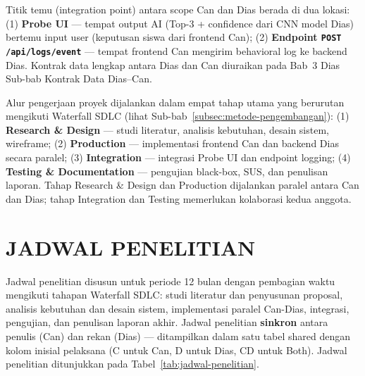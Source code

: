 \documentclass[12pt,a4paper,oneside,openany]{report}
\begin{document}
Titik temu (integration point) antara scope Can dan Dias berada di dua lokasi: (1) \textbf{Probe UI} --- tempat output AI (Top-3 + confidence dari CNN model Dias) bertemu input user (keputusan siswa dari frontend Can); (2) \textbf{Endpoint \texttt{POST /api/logs/event}} --- tempat frontend Can mengirim behavioral log ke backend Dias. Kontrak data lengkap antara Dias dan Can diuraikan pada Bab~3 Dias Sub-bab Kontrak Data Dias--Can.

Alur pengerjaan proyek dijalankan dalam empat tahap utama yang berurutan mengikuti Waterfall SDLC (lihat Sub-bab~\ref{subsec:metode-pengembangan}): (1) \textbf{Research \& Design} --- studi literatur, analisis kebutuhan, desain sistem, wireframe; (2) \textbf{Production} --- implementasi frontend Can dan backend Dias secara paralel; (3) \textbf{Integration} --- integrasi Probe UI dan endpoint logging; (4) \textbf{Testing \& Documentation} --- pengujian black-box, SUS, dan penulisan laporan. Tahap Research \& Design dan Production dijalankan paralel antara Can dan Dias; tahap Integration dan Testing memerlukan kolaborasi kedua anggota.

\section{JADWAL PENELITIAN}
\label{sec:jadwal-penelitian}

Jadwal penelitian disusun untuk periode 12 bulan dengan pembagian waktu mengikuti tahapan Waterfall SDLC: studi literatur dan penyusunan proposal, analisis kebutuhan dan desain sistem, implementasi paralel Can-Dias, integrasi, pengujian, dan penulisan laporan akhir. Jadwal penelitian \textbf{sinkron} antara penulis (Can) dan rekan (Dias) --- ditampilkan dalam satu tabel shared dengan kolom inisial pelaksana (C untuk Can, D untuk Dias, CD untuk Both). Jadwal penelitian ditunjukkan pada Tabel~\ref{tab:jadwal-penelitian}.
\end{document}
